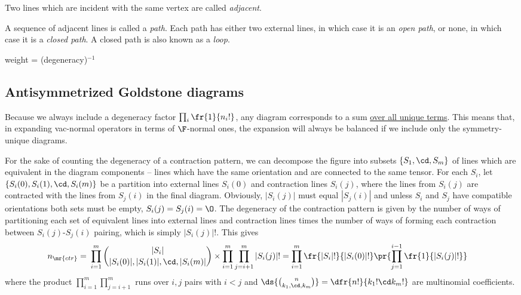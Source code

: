 \documentclass[11pt,fleqn]{article}
\numberwithin{equation}{section}
\begin{document}
\begin{dfn}
Two lines which are incident with the same vertex are called \textit{adjacent}.
\end{dfn}

\begin{dfn}
A sequence of adjacent lines is called a \textit{path}.
Each path has either two external lines, in which case it is an \textit{open path}, or none, in which case it is a \textit{closed path}.
A closed path is also known as a \textit{loop}.
\end{dfn}

\begin{dfn}
weight = (degeneracy)$^{-1}$
\end{dfn}

\begin{dfn}
\end{dfn}


\subsection{Antisymmetrized Goldstone diagrams}

\begin{rmk}
Because we always include a degeneracy factor $\prod_i\fr{1}{n_i!}$, any diagram corresponds to a sum \ul{over all unique terms}.
This means that, in expanding vac-normal operators in terms of $\F$-normal ones, the expansion will always be balanced if we include only the symmetry-unique diagrams.
\end{rmk}

\begin{drv}
For the sake of counting the degeneracy of a contraction pattern, we can decompose the figure into subsets $\{S_1,\cd,S_m\}$ of lines which are equivalent in the diagram components -- lines which have the same orientation and are connected to the same tensor.
For each $S_i$, let $\{S_i(0),S_i(1),\cd,S_i(m)\}$ be a partition into external lines $S_i(0)$ and contraction lines $S_i(j)$, where the lines from $S_i(j)$ are contracted with the lines from $S_j(i)$ in the final diagram.
Obviously, $|S_i(j)|$ must equal $|S_j(i)|$ and unless $S_i$ and $S_j$ have compatible orientations both sets must be empty, $S_i(j)=S_j(i)=\O$.
The degeneracy of the contraction pattern is given by the number of ways of partitioning each set of equivalent lines into external lines and contraction lines times the number of ways of forming each contraction between $S_i(j)$-$S_j(i)$ pairing, which is simply $|S_i(j)|!$.
This gives
\begin{align*}
  n_{\mr{ctr}}
=&\
  \prod_{i=1}^m
  {|S_i| \choose |S_i(0)|, |S_i(1)|,\cd, |S_i(m)|}
  \times
  \prod_{i=1}^m
  \prod_{j=i+1}^m
  |S_i(j)|!
=
  \prod_{i=1}^m
  \fr{|S_i|!}{|S_i(0)|!}
  \pr{
    \prod_{j=1}^{i-1}
    \fr{1}{|S_i(j)|!}
  }
\end{align*}
where the product $\prod_{i=1}^m\prod_{j=i+1}^m$ runs over $i,j$ pairs with $i<j$ and  $\ds{{n\choose k_1,\cd,k_m}}=\dfr{n!}{k_1!\cd k_m!}$ are multinomial coefficients.
\end{drv}
\end{document}
